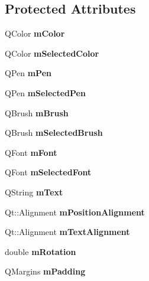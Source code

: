 \subsection*{Protected Attributes}
\begin{DoxyCompactItemize}
\item 
\mbox{\label{class_q_c_p_item_text_a8407f284ad867f627878cc26ef433d08}} 
Q\+Color {\bfseries m\+Color}
\item 
\mbox{\label{class_q_c_p_item_text_a7eb64e42f5f7998a97d8907ad25933c1}} 
Q\+Color {\bfseries m\+Selected\+Color}
\item 
\mbox{\label{class_q_c_p_item_text_aa02388705dbbff1bf7b8aa872b5f579c}} 
Q\+Pen {\bfseries m\+Pen}
\item 
\mbox{\label{class_q_c_p_item_text_a8eaec649606d6ead2d8d4dcb5691777c}} 
Q\+Pen {\bfseries m\+Selected\+Pen}
\item 
\mbox{\label{class_q_c_p_item_text_a2535911875faa459b8337f2efccb5cb8}} 
Q\+Brush {\bfseries m\+Brush}
\item 
\mbox{\label{class_q_c_p_item_text_a28ccd097b42a216d81db9c6869f54a59}} 
Q\+Brush {\bfseries m\+Selected\+Brush}
\item 
\mbox{\label{class_q_c_p_item_text_a1dc87fe2a824820d549ffd7e644eef8d}} 
Q\+Font {\bfseries m\+Font}
\item 
\mbox{\label{class_q_c_p_item_text_a6702f141fae590b2f4f1ec02fe9f8bd5}} 
Q\+Font {\bfseries m\+Selected\+Font}
\item 
\mbox{\label{class_q_c_p_item_text_a2dec3e08c11f51639629374ecec3bd62}} 
Q\+String {\bfseries m\+Text}
\item 
\mbox{\label{class_q_c_p_item_text_a6c27f7dc1a962a04b32430cf99f04654}} 
Qt\+::\+Alignment {\bfseries m\+Position\+Alignment}
\item 
\mbox{\label{class_q_c_p_item_text_acdb2e50c38e83da00f083771efbd213f}} 
Qt\+::\+Alignment {\bfseries m\+Text\+Alignment}
\item 
\mbox{\label{class_q_c_p_item_text_ac37df0061552225d2277e1ee3b48f2cb}} 
double {\bfseries m\+Rotation}
\item 
\mbox{\label{class_q_c_p_item_text_ae7b3ef0ce6046efd4b346d28f2e1fb67}} 
Q\+Margins {\bfseries m\+Padding}
\end{DoxyCompactItemize}

